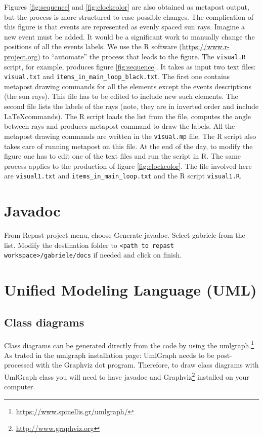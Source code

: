 \documentclass{book}
\begin{document}
Figures \ref{fig:sequence} and \ref{fig:clockcolor} are also obtained as metapost output, but the process is more structured to ease possible changes. The complication of this figure is that events are represented as evenly spaced sun rays. Imagine a new event must be added. It would be a significant work to manually change the positions of all the events labels. We use the R software (\href{https://www.r-project.org}{https://www.r-project.org}) to ``automate'' the process that leads to the figure. The \verb+visual.R+ script, for example, produces figure \ref{fig:sequence}. It takes as input two text files: \verb+visual.txt+ and \verb+items_in_main_loop_black.txt+. The first one contains metapost drawing commands for all the elements except the events descriptions (the sun rays). This file has to be edited to include new such elements. The second file lists the labels of the rays (note, they are in inverted order and include \LaTeX commands). The R script loads the list from the file, computes the angle between rays and produces metapost command to draw the labels. All the metapost drawing commands are written in the \verb+visual.mp+ file. The R script also takes care of running metapost on this file.
At the end of the day, to modify the figure one has to edit one of the text files and run the script in R. The same process applies to the production of figure \ref{fig:clockcolor}. The file involved here are \verb+visual1.txt+ and \verb+items_in_main_loop.txt+ and the R script \verb+visual1.R+.

\section{Javadoc}

From Repast project menu, choose Generate javadoc. Select gabriele from the list. Modify the destination folder to 
\verb+<path to repast workspace>/gabriele/docs+ if needed and click on finish.



\section{Unified Modeling Language (UML)}
\subsection{Class diagrams}

Class diagrams can be generated directly from the code by using the umlgraph.\footnote{\url{https://www.spinellis.gr/umlgraph/}} 
As trated in the umlgraph installation page:  
UmlGraph needs to be post-processed with the Graphviz dot program. Therefore, to draw class diagrams with UmlGraph class you will need to have javadoc and Graphviz\footnote{\url{http://www.graphviz.org}} installed on your computer. 
 
\end{document}
